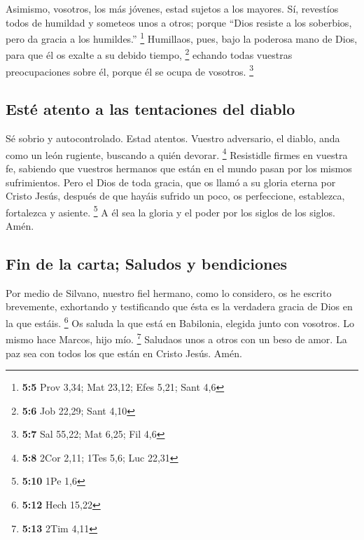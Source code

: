  Asimismo, vosotros, los más jóvenes, estad sujetos a los
mayores. Sí, revestíos todos de humildad y someteos unos a otros; porque
``Dios resiste a los soberbios, pero da gracia a los humildes.''
\footnote{\textbf{5:5} Prov 3,34; Mat 23,12; Efes 5,21; Sant 4,6}
 Humillaos, pues, bajo la poderosa mano de Dios, para que
él os exalte a su debido tiempo, \footnote{\textbf{5:6} Job 22,29; Sant
  4,10}  echando todas vuestras preocupaciones sobre él,
porque él se ocupa de vosotros. \footnote{\textbf{5:7} Sal 55,22; Mat
  6,25; Fil 4,6}

\hypertarget{estuxe9-atento-a-las-tentaciones-del-diablo}{%
\subsection{Esté atento a las tentaciones del
diablo}\label{estuxe9-atento-a-las-tentaciones-del-diablo}}

 Sé sobrio y autocontrolado. Estad atentos. Vuestro
adversario, el diablo, anda como un león rugiente, buscando a quién
devorar. \footnote{\textbf{5:8} 2Cor 2,11; 1Tes 5,6; Luc 22,31}
 Resistidle firmes en vuestra fe, sabiendo que vuestros
hermanos que están en el mundo pasan por los mismos sufrimientos.
 Pero el Dios de toda gracia, que os llamó a su gloria
eterna por Cristo Jesús, después de que hayáis sufrido un poco, os
perfeccione, establezca, fortalezca y asiente. \footnote{\textbf{5:10}
  1Pe 1,6}  A él sea la gloria y el poder por los siglos
de los siglos. Amén.

\hypertarget{fin-de-la-carta-saludos-y-bendiciones}{%
\subsection{Fin de la carta; Saludos y
bendiciones}\label{fin-de-la-carta-saludos-y-bendiciones}}

 Por medio de Silvano, nuestro fiel hermano, como lo
considero, os he escrito brevemente, exhortando y testificando que ésta
es la verdadera gracia de Dios en la que estáis. \footnote{\textbf{5:12}
  Hech 15,22}  Os saluda la que está en Babilonia,
elegida junto con vosotros. Lo mismo hace Marcos, hijo mío. \footnote{\textbf{5:13}
  2Tim 4,11}  Saludaos unos a otros con un beso de amor.
La paz sea con todos los que están en Cristo Jesús. Amén.

